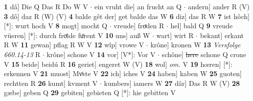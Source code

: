 \documentclass[8pt,a4paper,notitlepage]{article}
\begin{document}
\begin{table}[ht]
\begin{minipage}[t]{0.5\linewidth}
\textbf{1} dâ] Die Q Das R Do W V  $\cdot$ ein vruht die] an frucht an Q  $\cdot$ andern] ander R (V) \textbf{3} dô] daz R (W) (V) \textbf{4} balde gêt der] get balde das W \textbf{6} diz] das R W \textbf{7} ist hôch] [*]: wurt hoch V \textbf{8} mogt] mocht Q  $\cdot$ vreude] froͯden R  $\cdot$ hel] bald Q \textbf{9} vreude vüeren] [*]: durch froͤide fuͦrent V \textbf{10} uns] auß W  $\cdot$ wart] wirt R  $\cdot$ bekant] erkant R W \textbf{11} gewan] pflag R W V \textbf{12} wîp] vrowe V  $\cdot$ krône] kronen W \textbf{13} \textit{Versfolge 660.14-13} R   $\cdot$ krône] schone V \textbf{14} vor] [V*]: Vor V  $\cdot$ schône] \sout{here} schone Q crone V \textbf{15} beide] beidú R \textbf{16} geriet] engeret W (V) \textbf{18} wol] \textit{om.} V \textbf{19} hœren] [*]: erkennen V \textbf{21} muost] Mvͤste V \textbf{22} ich] iches V \textbf{24} haben] kaben W \textbf{25} guoten] rechtten R \textbf{26} kumt] kvment V  $\cdot$ kumbers] iamers W \textbf{27} dâr] Das R W (V) \textbf{28} gæbe] geben Q \textbf{29} gebiten] gebieten Q [*]: hie gebitten V \newline
\end{minipage}
\end{table}
\end{document}
